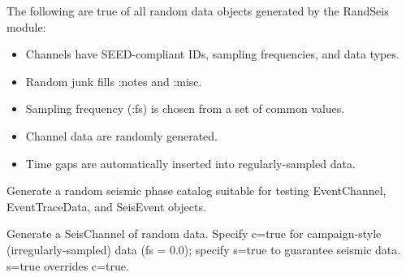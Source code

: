 \documentclass[letterpaper,11pt,english]{sphinxmanual}
\begin{document}
The following are true of all random data objects generated by the RandSeis
module:
\begin{itemize}
\item {} 
Channels have SEED-compliant IDs, sampling frequencies, and data types.

\item {} 
Random junk fills :notes and :misc.

\item {} 
Sampling frequency (:fs) is chosen from a set of common values.

\item {} 
Channel data are randomly generated.

\item {} 
Time gaps are automatically inserted into regularly-sampled data.

\end{itemize}

\begin{fulllineitems}
\label{\detokenize{src/Submodules/randseis:randPhaseCat}}
\end{fulllineitems}


Generate a random seismic phase catalog suitable for testing EventChannel,
EventTraceData, and SeisEvent objects.

\begin{fulllineitems}
\label{\detokenize{src/Submodules/randseis:randSeisChannel}}
\end{fulllineitems}


Generate a SeisChannel of random data. Specify c=true for campaign-style
(irregularly-sampled) data (fs = 0.0); specify s=true to guarantee seismic data.
s=true overrides c=true.

\begin{fulllineitems}
\label{\detokenize{src/Submodules/randseis:randSeisData}}
\end{fulllineitems}
\end{document}
